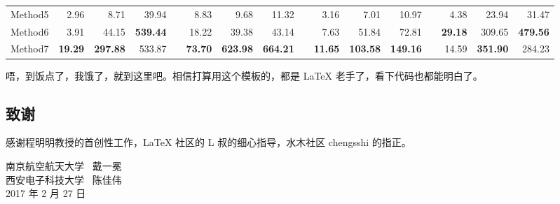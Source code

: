 \documentclass[a4paper,zihao=-4]{article}
\begin{document}
\begin{table}[htb!]
\begin{tabular}{lrrrrrrrrrrrrrrr}
		Method5 & 2.96                        & 8.71                        & 39.94                       &           & 8.83                        & 9.68                        & 11.32                       &           & 3.16                        & 7.01                        & 10.97                       &           & 4.38                        & 23.94                       & 31.47                       \\
		Method6 & 3.91                        & 44.15                       & \textbf{539.44}             & \textbf{} & 18.22                       & 39.38                       & 43.14                       &           & 7.63                        & 51.84                       & 72.81                       &           & \textbf{29.18}              & 309.65                      & \textbf{479.56}             \\
		Method7 & \textbf{19.29}              & \textbf{297.88}             & 533.87                      &           & \textbf{73.70}              & \textbf{623.98}             & \textbf{664.21}             & \textbf{} & \textbf{11.65}              & \textbf{103.58}             & \textbf{149.16}             & \textbf{} & 14.59                       & \textbf{351.90}             & 284.23                      \\
		\bottomrule
	\end{tabular}%
	\label{tab:Quantitative}%
\end{table}%

唔，到饭点了，我饿了，就到这里吧。相信打算用这个模板的，都是 LaTeX 老手了，看下代码也都能明白了。

\subsection*{致谢}
感谢程明明教授的首创性工作，LaTeX 社区的 L 叔的细心指导，水木社区 chengsshi 的指正。

{
	\raggedleft
	南京航空航天大学~ 戴一冕\\
	西安电子科技大学~ 陈佳伟\\
	2017 年 2 月 27 日\\
}



\end{document}
